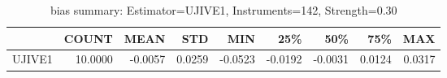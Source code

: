 \begin{table}[ht]
\centering
\caption{bias summary: Estimator=UJIVE1, Instruments=142, Strength=0.30}
\begin{tabular}{lrrrrrrrr}
\toprule
 & COUNT & MEAN & STD & MIN & 25\% & 50\% & 75\% & MAX \\
\midrule
UJIVE1 & 10.0000 & -0.0057 & 0.0259 & -0.0523 & -0.0192 & -0.0031 & 0.0124 & 0.0317 \\
\bottomrule
\end{tabular}
\end{table}

